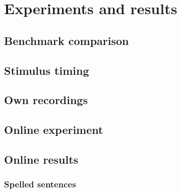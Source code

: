 
\chapter{Experiments and results}
\label{ch:results}

\section{Benchmark comparison}
\label{sec:benchmark}

\section{Stimulus timing}
\label{sec:timing-results}

\section{Own recordings}
\label{sec:own-recordings}

\section{Online experiment}
\label{sec:online-experiment}

\section{Online results}
\label{sec:online-results}

\subsection{Spelled sentences}
\label{sec:spelled-sentences}

